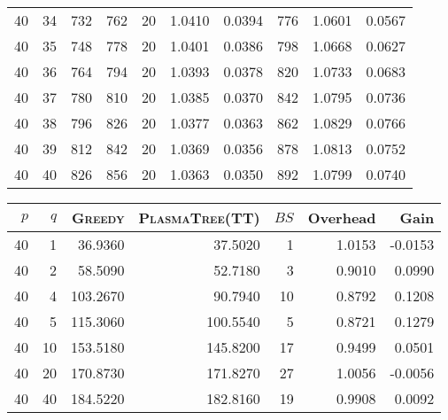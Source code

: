 \documentclass[a4paper,twopages]{article}
\newcommand{\BS}{\ensuremath{\mathit{BS}}\xspace}
\newcommand{\MC}{\textsc{Fibonacci}\xspace}
\newcommand{\Greedy}{\textsc{Greedy}\xspace}
\newcommand{\PT}{\textsc{PlasmaTree}\xspace}
\begin{document}
\begin{table*}
{\begin{tabular}{|r|r|r||r|r|r|r||r|r|r|}
       40 &34 &    732 &    762 &    20 &   1.0410 &  0.0394 &  776 &   1.0601 &  0.0567\\
       40 &35 &    748 &    778 &    20 &   1.0401 &  0.0386 &  798 &   1.0668 &  0.0627\\
       40 &36 &    764 &    794 &    20 &   1.0393 &  0.0378 &  820 &   1.0733 &  0.0683\\
       40 &37 &    780 &    810 &    20 &   1.0385 &  0.0370 &  842 &   1.0795 &  0.0736\\
       40 &38 &    796 &    826 &    20 &   1.0377 &  0.0363 &  862 &   1.0829 &  0.0766\\
       40 &39 &    812 &    842 &    20 &   1.0369 &  0.0356 &  878 &   1.0813 &  0.0752\\
       40 &40 &    826 &    856 &    20 &   1.0363 &  0.0350 &  892 &   1.0799 &  0.0740\\
       \hline
    \end{tabular}
    }
    \caption{\Greedy versus \PT (TT) and \MC (Theoretical)}
\end{table*}
\begin{table*}
    \centering
    \centering
    \begin{tabular}{|r|r|r||r|r|r|r|}
       \hline
         $p$ &  $q$ & \Greedy & \PT (TT) & \BS & Overhead &   Gain\\
         \hline
        40 &  1 &   36.9360 &   37.5020 &  1 &   1.0153 &-0.0153\\
        40 &  2 &   58.5090 &   52.7180 &  3 &   0.9010 & 0.0990\\
        40 &  4 &  103.2670 &   90.7940 & 10 &   0.8792 & 0.1208\\
        40 &  5 &  115.3060 &  100.5540 &  5 &   0.8721 & 0.1279\\
        40 & 10 &  153.5180 &  145.8200 & 17 &   0.9499 & 0.0501\\
        40 & 20 &  170.8730 &  171.8270 & 27 &   1.0056 &-0.0056\\
        40 & 40 &  184.5220 &  182.8160 & 19 &   0.9908 & 0.0092\\
       \hline
    \end{tabular}
    \caption{\Greedy versus \PT (TT) (Experimental Double)}
\end{table*}
\end{document}

